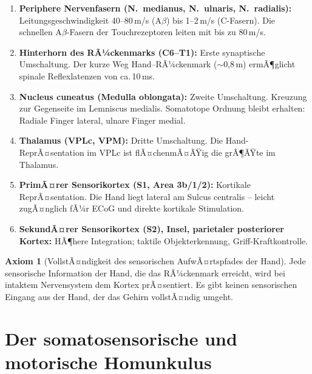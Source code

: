 ﻿\documentclass[12pt,a4paper]{report}
\theoremstyle{plain}
\theoremstyle{definition}
\newtheorem{axiom}[theorem]{Axiom}
\theoremstyle{remark}
\begin{document}
\begin{enumerate}
\item \textbf{Periphere Nervenfasern (N.\ medianus, N.\ ulnaris, N.\ radialis):}
  Leitungsgeschwindigkeit 40--80\,m/s (A$\beta$) bis 1--2\,m/s (C-Fasern).
  Die schnellen A$\beta$-Fasern der Touchrezeptoren leiten mit bis zu 80\,m/s.
\item \textbf{Hinterhorn des RÃ¼ckenmarks (C6--T1):} Erste synaptische
  Umschaltung. Der kurze Weg Hand--RÃ¼ckenmark ($\sim$0{,}8\,m) ermÃ¶glicht
  spinale Reflexlatenzen von ca.\,10\,ms.
\item \textbf{Nucleus cuneatus (Medulla oblongata):} Zweite Umschaltung.
  Kreuzung zur Gegenseite im Lemniscus medialis. Somatotope Ordnung bleibt
  erhalten: Radiale Finger lateral, ulnare Finger medial.
\item \textbf{Thalamus (VPLc, VPM):} Dritte Umschaltung. Die Hand-ReprÃ¤sentation
  im VPLc ist flÃ¤chenmÃ¤ÃŸig die grÃ¶ÃŸte im Thalamus.
\item \textbf{PrimÃ¤rer Sensorikortex (S1, Area 3b/1/2):} Kortikale ReprÃ¤sentation.
  Die Hand liegt lateral am Sulcus centralis -- leicht zugÃ¤nglich fÃ¼r
  ECoG und direkte kortikale Stimulation.
\item \textbf{SekundÃ¤rer Sensorikortex (S2), Insel, parietaler posteriorer Kortex:}
  HÃ¶here Integration; taktile Objekterkennung, Griff-Kraftkontrolle.
\end{enumerate}

\begin{axiom}[VollstÃ¤ndigkeit des sensorischen AufwÃ¤rtspfades der Hand]
\label{ax:vollstaendigkeit}
Jede sensorische Information der Hand, die das RÃ¼ckenmark erreicht, wird
bei intaktem Nervensystem dem Kortex prÃ¤sentiert. Es gibt keinen
sensorischen Eingang aus der Hand, der das Gehirn vollstÃ¤ndig umgeht.
\end{axiom}

\chapter{Der somatosensorische und motorische Homunkulus}
\label{chap:homunkulus}
\end{document}
